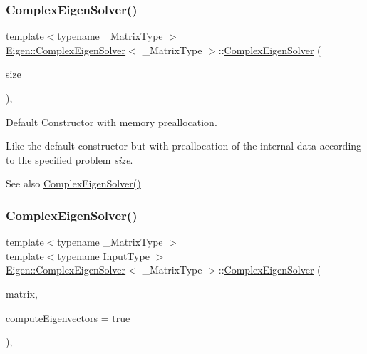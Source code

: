 \subsubsection{\texorpdfstring{ComplexEigenSolver()}{ComplexEigenSolver()}\hspace{0.1cm}{\footnotesize\ttfamily [2/3]}}
{\footnotesize\ttfamily template$<$typename \+\_\+\+Matrix\+Type $>$ \\
\mbox{\hyperlink{class_eigen_1_1_complex_eigen_solver}{Eigen\+::\+Complex\+Eigen\+Solver}}$<$ \+\_\+\+Matrix\+Type $>$\+::\mbox{\hyperlink{class_eigen_1_1_complex_eigen_solver}{Complex\+Eigen\+Solver}} (\begin{DoxyParamCaption}\item[{\mbox{\hyperlink{class_eigen_1_1_complex_eigen_solver_abc0218d8b902af0d6c759bfc0a8a8d74}{Index}}}]{size }\end{DoxyParamCaption})\hspace{0.3cm}{\ttfamily [inline]}, {\ttfamily [explicit]}}



Default Constructor with memory preallocation. 

Like the default constructor but with preallocation of the internal data according to the specified problem {\itshape size}. \begin{DoxySeeAlso}{See also}
\mbox{\hyperlink{class_eigen_1_1_complex_eigen_solver_a3322a21574c61eefd450c003515ad802}{Complex\+Eigen\+Solver()}} 
\end{DoxySeeAlso}
\mbox{\label{class_eigen_1_1_complex_eigen_solver_a748de5c1e7f730e16421e6d451437600}} 
\subsubsection{\texorpdfstring{ComplexEigenSolver()}{ComplexEigenSolver()}\hspace{0.1cm}{\footnotesize\ttfamily [3/3]}}
{\footnotesize\ttfamily template$<$typename \+\_\+\+Matrix\+Type $>$ \\
template$<$typename Input\+Type $>$ \\
\mbox{\hyperlink{class_eigen_1_1_complex_eigen_solver}{Eigen\+::\+Complex\+Eigen\+Solver}}$<$ \+\_\+\+Matrix\+Type $>$\+::\mbox{\hyperlink{class_eigen_1_1_complex_eigen_solver}{Complex\+Eigen\+Solver}} (\begin{DoxyParamCaption}\item[{const \mbox{\hyperlink{struct_eigen_1_1_eigen_base}{Eigen\+Base}}$<$ Input\+Type $>$ \&}]{matrix,  }\item[{bool}]{compute\+Eigenvectors = {\ttfamily true} }\end{DoxyParamCaption})\hspace{0.3cm}{\ttfamily [inline]}, {\ttfamily [explicit]}}



